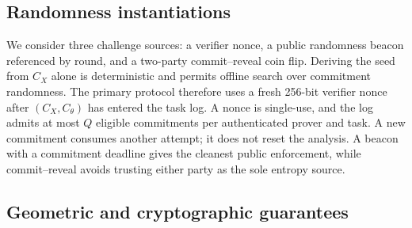 \documentclass[pdflatex,sn-mathphys-num,iicol]{sn-jnl}
\newcommand{\tpexplain}[1]{}
\theoremstyle{plain}
\theoremstyle{definition}
\theoremstyle{remark}
\begin{document}
\subsection{Randomness instantiations}
\tpexplain{Give deployable alternatives and state the trust/freshness assumption for each. Select one primary instantiation for experiments.}
We consider three challenge sources: a verifier nonce, a public randomness beacon referenced by round, and a two-party commit--reveal coin flip. Deriving the seed from $C_X$ alone is deterministic and permits offline search over commitment randomness. The primary protocol therefore uses a fresh 256-bit verifier nonce after $(C_X,C_\theta)$ has entered the task log. A nonce is single-use, and the log admits at most $Q$ eligible commitments per authenticated prover and task. A new commitment consumes another attempt; it does not reset the analysis. A beacon with a commitment deadline gives the cleanest public enforcement, while commit--reveal avoids trusting either party as the sole entropy source.

\subsection{Geometric and cryptographic guarantees}\label{sec:theory}
\end{document}

